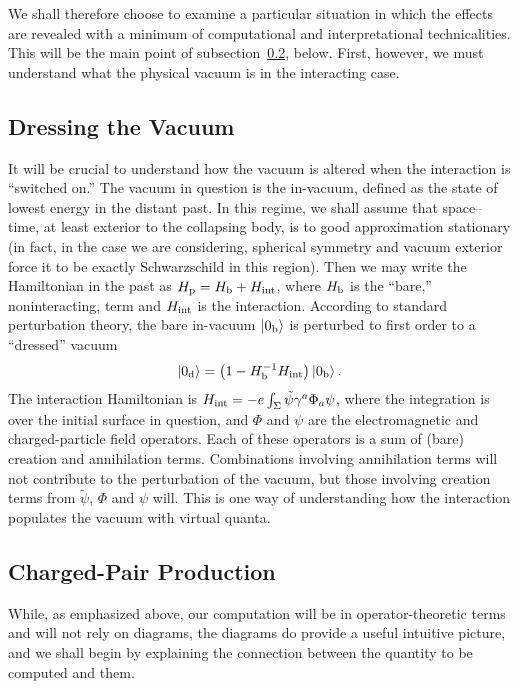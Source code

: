 \documentclass[12pt]{article}
\begin{document}
We shall therefore
choose to examine a particular situation in which the effects
are revealed with a minimum of computational and interpretational
technicalities.  This will be the main point of subsection~\ref{comp}, below.
First, however, we must understand what the physical vacuum is in the
interacting case.

\subsection{Dressing the Vacuum}

It will be crucial to understand how the vacuum is altered when the interaction
is ``switched on.''  The vacuum in question is the in-vacuum, defined as the
state of lowest energy in the distant past.  In this regime, we shall assume
that space--time, at least exterior to the collapsing body, is to good
approximation stationary (in fact, in the case we are considering, spherical
symmetry and vacuum exterior force it to be exactly Schwarzschild in this
region).  Then we may write the Hamiltonian in the past as $H_{\rm p}=H_{\rm
b}+H_{\rm int}$, where $H_{\rm b}$  is the ``bare,'' noninteracting, term and
$H_{\rm int}$ is the interaction.  According to standard perturbation theory,
the bare in-vacuum $|0_{\rm b}\rangle$ is perturbed to first order to a
``dressed'' vacuum
\begin{equation}
|0_{\rm d}\rangle =\left( 1-H_{\rm b}^{-1} H_{\rm int}\right) |0_{\rm b}\rangle
  \, .
\end{equation}
The interaction Hamiltonian is $H_{\rm int}=-e\int _\Sigma 
\tilde\psi \gamma ^a\Phi _a\psi $, where the integration is over the initial
surface in question, and $\Phi$ and $\psi$ are the electromagnetic and
charged-particle field operators.  Each of these operators is a sum of (bare)
creation and annihilation terms.  Combinations involving annihilation terms will
not contribute to the perturbation of the vacuum, but those involving creation
terms from $\tilde\psi$, $\Phi$ and $\psi$ will.  This is one way of
understanding how the interaction populates
the vacuum with virtual quanta.

\subsection{Charged-Pair Production}\label{comp}

While, as emphasized above, our computation will be in
operator-theoretic terms and will not rely on diagrams, the diagrams
do provide a useful intuitive picture, and we shall begin by
explaining the connection between the quantity to be computed and them.
\end{document}
